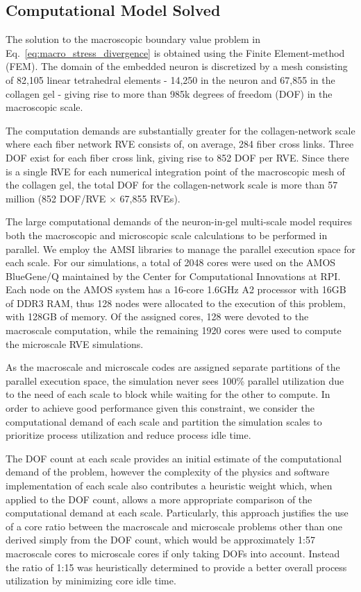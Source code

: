 \documentclass[]{interact}
\begin{document}
\subsection{Computational Model Solved}\label{sec:specification}
The solution to the macroscopic boundary value problem in Eq.\ \eqref{eq:macro_stress_divergence} is obtained using the Finite Element-method (FEM). The domain of the embedded neuron is discretized by a mesh consisting of  82,105 linear tetrahedral elements - 14,250 in the neuron and 67,855 in the collagen gel - giving rise to more than 985k degrees of freedom (DOF) in the macroscopic scale.

The computation demands are substantially greater for the collagen-network scale where each fiber network RVE consists of, on average, 284 fiber cross links. Three DOF exist for each fiber cross link, giving rise to 852 DOF per RVE. Since there is a single RVE for each numerical integration point of the macroscopic mesh of the collagen gel, the total DOF for the collagen-network scale is more than 57 million (852 DOF/RVE $\times$ 67,855 RVEs). 

The large computational demands of the neuron-in-gel multi-scale model requires both the macroscopic and microscopic scale calculations to be performed in parallel. We employ the AMSI libraries to manage the parallel execution space for each scale. For our simulations, a total of 2048 cores were used on the AMOS BlueGene/Q maintained by the Center for Computational Innovations at RPI. Each node on the AMOS system has a 16-core 1.6GHz A2 processor with 16GB of DDR3 RAM, thus 128 nodes were allocated to the execution of this problem, with 128GB of memory. Of the assigned cores, 128 were devoted to the macroscale computation, while the remaining 1920 cores were used to compute the microscale RVE simulations. 

As the macroscale and microscale codes are assigned separate partitions of the parallel execution space, the simulation never sees 100\% parallel utilization due to the need of each scale to block while waiting for the other to compute. In order to achieve good performance given this constraint, we consider the computational demand of each scale and partition the simulation scales to prioritize process utilization and reduce process idle time.

The DOF count at each scale provides an initial estimate of the computational demand of the problem, however the complexity of the physics and software implementation of each scale also contributes a heuristic weight which, when applied to the DOF count, allows a more appropriate comparison of the computational demand at each scale. Particularly, this approach justifies the use of a core ratio between the macroscale and microscale problems other than one derived simply from the DOF count, which would be approximately 1:57 macroscale cores to microscale cores if only taking DOFs into account. Instead the ratio of 1:15 was heuristically determined to provide a better overall process utilization by minimizing core idle time.
\end{document}
